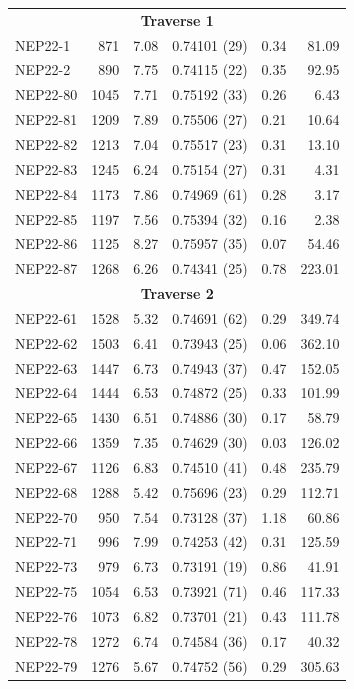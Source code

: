 \begin{landscape}
\begin{minipage}{0.48\linewidth}
\begin{longtable}{l r r l r r}
            \multicolumn{6}{c}{\textbf{Traverse 1}} \\
            NEP22-1 & 871 & 7.08 & 0.74101 \hfill (29) & 0.34 & 81.09 \\
            NEP22-2 & 890 & 7.75 & 0.74115 \hfill (22) & 0.35 & 92.95 \\
            NEP22-80 & 1045 & 7.71 & 0.75192 \hfill (33) & 0.26 & 6.43 \\
            NEP22-81 & 1209 & 7.89 & 0.75506 \hfill (27) & 0.21 & 10.64 \\
            NEP22-82 & 1213 & 7.04 & 0.75517 \hfill (23) & 0.31 & 13.10 \\
            NEP22-83 & 1245 & 6.24 & 0.75154 \hfill (27) & 0.31 & 4.31 \\
            NEP22-84 & 1173 & 7.86 & 0.74969 \hfill (61) & 0.28 & 3.17 \\
            NEP22-85 & 1197 & 7.56 & 0.75394 \hfill (32) & 0.16 & 2.38 \\
            NEP22-86 & 1125 & 8.27 & 0.75957 \hfill (35) & 0.07 & 54.46 \\
            NEP22-87 & 1268 & 6.26 & 0.74341 \hfill (25) & 0.78 & 223.01 \\
            \hline
            
            \multicolumn{6}{c}{\textbf{Traverse 2}} \\

            NEP22-61 & 1528 & 5.32 & 0.74691 \hfill (62) & 0.29 & 349.74 \\
            NEP22-62 & 1503 & 6.41 & 0.73943 \hfill (25) & 0.06 & 362.10 \\
            NEP22-63 & 1447 & 6.73 & 0.74943 \hfill (37) & 0.47 & 152.05 \\
            NEP22-64 & 1444 & 6.53 & 0.74872 \hfill (25) & 0.33 & 101.99 \\
            NEP22-65 & 1430 & 6.51 & 0.74886 \hfill (30) & 0.17 & 58.79 \\
            NEP22-66 & 1359 & 7.35 & 0.74629 \hfill (30) & 0.03 & 126.02 \\
            NEP22-67 & 1126 & 6.83 & 0.74510 \hfill (41) & 0.48 & 235.79 \\
            NEP22-68 & 1288 & 5.42 & 0.75696 \hfill (23) & 0.29 & 112.71 \\
            NEP22-70 & 950 & 7.54 & 0.73128 \hfill (37) & 1.18 & 60.86 \\
            NEP22-71 & 996 & 7.99 & 0.74253 \hfill (42) & 0.31 & 125.59 \\
            NEP22-73 & 979 & 6.73 & 0.73191 \hfill (19) & 0.86 & 41.91 \\
            NEP22-75 & 1054 & 6.53 & 0.73921 \hfill (71) & 0.46 & 117.33 \\
            NEP22-76 & 1073 & 6.82 & 0.73701 \hfill (21) & 0.43 & 111.78 \\
            NEP22-78 & 1272 & 6.74 & 0.74584 \hfill (36) & 0.17 & 40.32 \\
            NEP22-79 & 1276 & 5.67 & 0.74752 \hfill (56) & 0.29 & 305.63 \\
            \hline


\end{longtable}
\end{minipage}
\end{landscape}
